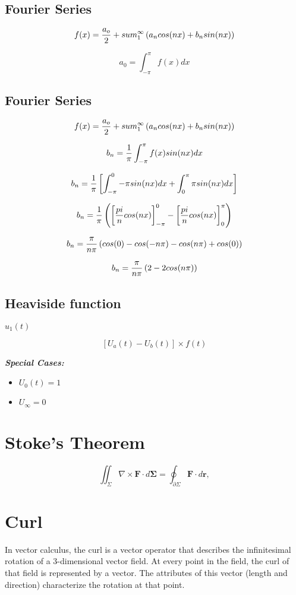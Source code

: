 \documentclass[12pt, a4paper]{article}
\begin{document}
\subsection*{Fourier Series}

\[ f(x) =  {a_o \over 2} + sum^{\infty}_1 \left( a_ncos(nx) + b_nsin(nx) \right) \]

\[ a_0 = \int^{\pi}_{-\pi}f(x) dx  \]


\subsection*{Fourier Series}

\[ f(x) =  {a_o \over 2} + sum^{\infty}_1 \left( a_ncos(nx) + b_nsin(nx) \right) \]

\[ b_n = {1 \over \pi}\int^{\pi}_{-\pi}f(x) sin(nx)dx  \]


\[ b_n = {1 \over \pi} \left[\int^{0}_{-\pi}-\pi sin(nx)dx + \int^{\pi}_{0}\pi sin(nx)dx  \right] \]


\[ b_n = {1 \over \pi}  \left( \left[ \frac{pi}{n}cos(nx) \right]^0_{-\pi} - \left[ \frac{pi}{n}cos(nx) \right]^{\pi}_0 \right) \]

\[ b_n = {\pi \over n\pi} \left( cos(0) - cos(-n\pi) -  cos(n\pi) + cos(0) \right) \]

\[b_n = { \pi \over n\pi} \left( 2 - 2cos(n\pi)  \right) \]

\subsection*{Heaviside function}
$u_1(t)$


\[ \left[U_a(t)  - U_b(t) \right] \times f(t) \]

\textbf{\emph{Special Cases:}}
\begin{itemize}
\item $U_0(t) = 1$
\item $U_{\infty} = 0$
\end{itemize}
\section{Stoke's Theorem}
\[
\iint_{\Sigma} \nabla \times \mathbf{F} \cdot d\mathbf{\Sigma} = \oint_{\partial\Sigma} \mathbf{F} \cdot d \mathbf{r}, \]
\section{Curl}
In vector calculus, the curl is a vector operator that describes the infinitesimal rotation of a 3-dimensional vector field. At every point in the field, the curl of that field is represented by a vector. The attributes of this vector (length and direction) characterize the rotation at that point.
\end{document}
